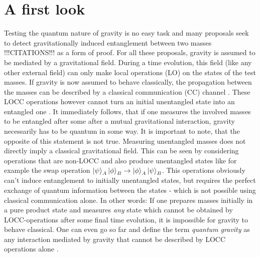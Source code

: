 \chapter{A first look}\label{cha:first-look}

Testing the quantum nature of gravity is no easy task and many proposals seek to detect gravitationally induced entanglement between two masses \cite{Bose_2017}!!!CITATIONS!!! as a form of proof. 
For all these proposals, gravity is assumed to be mediated by a gravitational field.
During a time evolution, this field (like any other external field) can only make local operations (LO) on the states of the test masses. If gravity is now assumed to behave classically, the propagation between the masses can be described by a classical communication (CC) channel \cite{Lami_2024,Bose_2017}.
These LOCC operations however cannot turn an initial unentangled state into an entangled one \cite{Horodecki_2009, Plenio_2005a}.
It immediately follows, that if one measures the involved masses to be entangled after some after a mutual gravitational interaction, gravity necessarily has to be quantum in some way.
It is important to note, that the opposite of this statement is not true. Measuring unentangled masses does not directly imply a classical gravitational field.
This can be seen by considering operations that are non-LOCC and also produce unentangled states like for example the swap operation $\ket{\psi}_A\ket{\phi}_B \rightarrow \ket{\phi}_A\ket{\psi}_B$. This operations obviously can't induce entanglement to initially unentangled states, but requires the perfect exchange of quantum information between the states - which is not possible using classical communication alone.
In other words: If one prepares masses initially in a pure product state and measures \textit{any} state which cannot be obtained by LOCC-operations after some final time evolution, it is impossible for gravity to behave classical. One can even go so far and define the term \emph{quantum gravity} as any interaction mediated by gravity that cannot be described by LOCC operations alone \cite{Lami_2024}.

